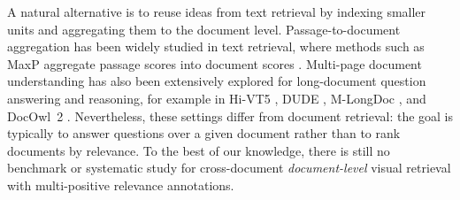 A natural alternative is to reuse ideas from text retrieval by indexing smaller units and aggregating them to the document level. Passage-to-document aggregation has been widely studied in text retrieval, where methods such as MaxP aggregate passage scores into document scores \citep{dai2019deeper,li2023parade}. Multi-page document understanding has also been extensively explored for long-document question answering and reasoning, for example in Hi-VT5 \citep{tito2023hivt5}, DUDE \citep{Van_Landeghem_2023_ICCV}, M-LongDoc \citep{chia-etal-2025-longdoc}, and DocOwl~2 \citep{hu2025docowl2}. Nevertheless, these settings differ from document retrieval: the goal is typically to answer questions over a given document rather than to rank documents by relevance. To the best of our knowledge, there is still no benchmark or systematic study for cross-document \emph{document-level} visual retrieval with multi-positive relevance annotations.